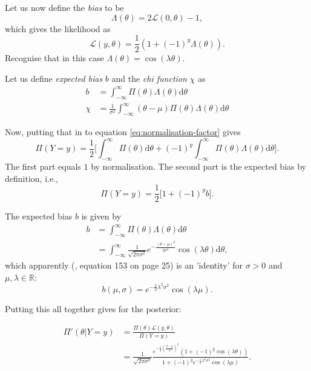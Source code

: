 \documentclass[]{report}
\begin{document}
Let us now define the \textit{bias} to be
\begin{equation}
    \Lambda ( \theta) = 2 \mathcal{L} (0, \theta) - 1,
\end{equation}
which gives the likelihood as
\begin{equation}
    \mathcal{L} (y, \theta) = \frac{1}{2}(1 + (-1)^{y} \Lambda(\theta)).
\end{equation}
Recognise that in this case $\Lambda(\theta) = \cos(\lambda \theta)$.


Let us define \textit{expected bias} $b$ and the \textit{chi function} $\chi$ as
\begin{align}
\label{eq:b}
    b &= \int_{-\infty}^{\infty} \Pi(\theta) \Lambda (\theta) \text{d} \theta\\
\label{eq:chi}
    \chi &= \frac{1}{\sigma^2} \int_{-\infty}^{\infty} (\theta - \mu)\Pi(\theta) \Lambda (\theta) \text{d} \theta
\end{align}

Now, putting that in to equation \eqref{eq:normalisation-factor} gives
\begin{equation}
    \Pi(Y=y) = \frac{1}{2} \Big[ \int_{-\infty}^{\infty} \Pi(\theta) \text{d}\theta + (-1)^y \int_{-\infty}^{\infty} \Pi(\theta) \Lambda (\theta) \text{d} \theta \Big].
\end{equation}
The first part equals $1$ by normalisation. The second part is the expected bias by definition, i.e.,
\begin{equation}
     \Pi(Y=y) = \frac{1}{2} \Big[ 1 + (-1)^y b\Big].
\end{equation}

The expected bias $b$ is given by
\begin{align}
    b   &= \int_{-\infty}^{\infty} \Pi(\theta) \Lambda (\theta) \text{d} \theta\\
        &= \int_{-\infty}^{\infty} \frac{1}{\sqrt{2\pi \sigma^2}} e^{-\frac{(\theta - \mu)^2}{2\sigma^2}} \cos(\lambda \theta) \text{d} \theta,
\end{align}
which apparently (\cite{Koh2020}, equation 153 on page 25) is an 'identity' for $\sigma > 0$ and $\mu, \lambda \in \mathbb{R}$:
\begin{equation}
\label{eq:b-gaussian}
    b(\mu, \sigma) = e^{-\frac{1}{2}\lambda^2\sigma^2} \cos (\lambda \mu).
\end{equation}


Putting this all together gives for the posterior:

\begin{align}
    \Pi'(\theta|Y = y)  &= \frac{\Pi(\theta) \mathcal{L} (y, \theta)}{\Pi(Y=y)}\\
    &= \frac{1}{\sqrt{2\pi \sigma^2}}\frac{e^{-\frac{1}{2}(\frac{\theta - \mu}{\sigma})^2} ( 1 + (-1)^y \cos(\lambda \theta))}{1 + (-1)^y e^{-\frac{1}{2}\lambda^2\sigma^2} \cos (\lambda \mu)}.
\end{align}
\end{document}

